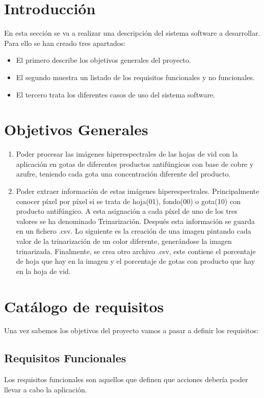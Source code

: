 
\section{Introducción}
En esta sección se va a realizar una descripción del sistema software a desarrollar. Para ello se han creado tres apartados:
\begin{itemize}
    \item El primero describe los objetivos generales del proyecto.
    \item El segundo muestra un listado de los requisitos funcionales y no funcionales.
    \item El tercero trata los diferentes casos de uso del sistema software.
\end{itemize}

\section {Objetivos Generales}
\begin{enumerate}
    \item Poder procesar las imágenes hiperespectrales de las hojas de vid con la aplicación en gotas de diferentes productos antifúngicos con base de cobre y azufre, teniendo cada gota una concentración diferente del producto.
    \item Poder extraer información de estas imágenes hiperespectrales. Principalmente conocer píxel por píxel si se trata de hoja(01), fondo(00) o gota(10) con producto antifúngico. A esta asignación a cada píxel de uno de los tres valores se ha denominado Trinarización. Después esta información se guarda en un fichero .csv. Lo siguiente es la creación de  una imagen pintando cada valor de la trinarización de un color diferente, generándose la imagen trinarizada. Finalmente, se crea otro archivo .csv, este contiene el porcentaje de hoja que hay en la imagen y el porcentaje de gotas con producto que hay en la hoja de vid.
\end{enumerate}

\section{Catálogo de requisitos}
Una vez sabemos los objetivos del proyecto vamos a pasar a definir los requisitos: 

\subsection{Requisitos Funcionales}
Los requisitos funcionales son aquellos que definen que acciones debería poder llevar a cabo la aplicación.

